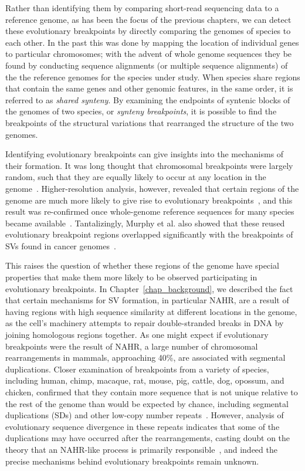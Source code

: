Rather than identifying them by comparing short-read sequencing data to a reference genome, as has been the focus of the previous chapters, we can detect these evolutionary breakpoints by directly comparing the genomes of species to each other. In the past this was done by mapping the location of individual genes to particular chromosomes; with the advent of whole genome sequences they be found by conducting sequence alignments (or multiple sequence alignments) of the the reference genomes for the species under study. When species share regions that contain the same genes and other genomic features, in the same order, it is referred to as \emph{shared synteny}. By examining the endpoints of syntenic blocks of the genomes of two species, or \emph{synteny breakpoints}, it is possible to find the breakpoints of the structural variations that rearranged the structure of the two genomes.

Identifying evolutionary breakpoints can give insights into the mechanisms of their formation. It was long thought that chromosomal breakpoints were largely random, such that they are equally likely to occur at any location in the genome~\cite{Ono:1973tr,Nadeau:1984tm}. Higher-resolution analysis, however, revealed that certain regions of the genome are much more likely to give rise to evolutionary breakpoints~\cite{Pevzner:2003ba}, and this result was re-confirmed once whole-genome reference sequences for many species became available~\cite{Murphy:2005hv}. Tantalizingly, Murphy et al. also showed that these reused evolutionary breakpoint regions overlapped significantly with the breakpoints of SVs found in cancer genomes~\cite{Murphy:2005hv}.

This raises the question of whether these regions of the genome have special properties that make them more likely to be observed participating in evolutionary breakpoints. In Chapter~\ref{chap_background}, we described the fact that certain mechanisms for SV formation, in particular NAHR, are a result of having regions with high sequence similarity at different locations in the genome, as the cell's machinery attempts to repair double-stranded breaks in DNA by joining homologous regions together. As one might expect if evolutionary breakpoints were the result of NAHR, a large number of chromosomal rearrangements in mammals, approaching 40\%, are associated with segmental duplications\cite{Bailey:2004fb,Bailey:2006fn}. Closer examination of breakpoints from a variety of species, including human, chimp, macaque, rat, mouse, pig, cattle, dog, opossum, and chicken, confirmed that they contain more sequence that is not unique relative to the rest of the genome than would be expected by chance, including segmental duplications (SDs) and other low-copy number repeats~\cite{Larkin:2009ij}. However, analysis of evolutionary sequence divergence in these repeats indicates that some of the duplications may have occurred after the rearrangements, casting doubt on the theory that an NAHR-like process is primarily responsible~\cite{Bailey:2004fb}, and indeed the precise mechanisms behind evolutionary breakpoints remain unknown.

